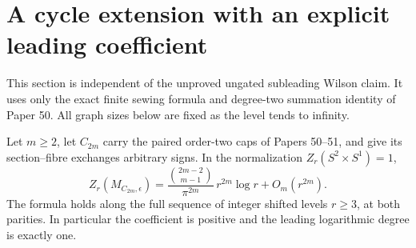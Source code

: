 \section{A cycle extension with an explicit leading coefficient}
\label{sec:cycles}
This section is independent of the unproved ungated subleading Wilson
claim. It uses only the exact finite sewing formula and degree-two
summation identity of Paper 50. All graph sizes below are fixed as the
level tends to infinity.

\begin{theorem}\label{thm:cycles}
Let $m\geq2$, let $C_{2m}$ carry the paired order-two caps of Papers
50--51, and give its section--fibre exchanges arbitrary signs.
In the normalization $Z_r(S^2\times S^1)=1$,
\[
 Z_r(M_{C_{2m},\epsilon})=
 \frac{\binom{2m-2}{m-1}}{\pi^{2m}}\,r^{2m}\log r
 +O_m(r^{2m}).
\]
The formula holds along the full sequence of integer shifted levels
$r\geq3$, at both parities. In particular the coefficient is positive
and the leading logarithmic degree is exactly one.
\end{theorem}

